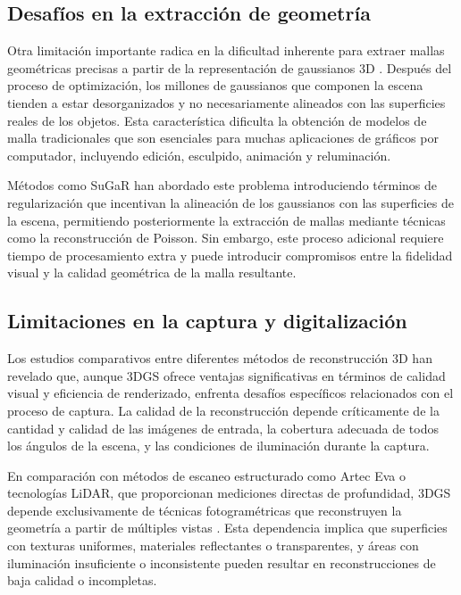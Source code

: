 \documentclass[lettersize,journal]{IEEEtran}
\begin{document}
\subsection{Desafíos en la extracción de geometría}

Otra limitación importante radica en la dificultad inherente para extraer mallas geométricas precisas a partir de la representación de gaussianos 3D \cite{Gudon2024}. Después del proceso de optimización, los millones de gaussianos que componen la escena tienden a estar desorganizados y no necesariamente alineados con las superficies reales de los objetos. Esta característica dificulta la obtención de modelos de malla tradicionales que son esenciales para muchas aplicaciones de gráficos por computador, incluyendo edición, esculpido, animación y reluminación.

Métodos como SuGaR \cite{Gudon2024} han abordado este problema introduciendo términos de regularización que incentivan la alineación de los gaussianos con las superficies de la escena, permitiendo posteriormente la extracción de mallas mediante técnicas como la reconstrucción de Poisson. Sin embargo, este proceso adicional requiere tiempo de procesamiento extra y puede introducir compromisos entre la fidelidad visual y la calidad geométrica de la malla resultante.

\subsection{Limitaciones en la captura y digitalización}

Los estudios comparativos entre diferentes métodos de reconstrucción 3D \cite{Cascarano2025, Doma2025} han revelado que, aunque 3DGS ofrece ventajas significativas en términos de calidad visual y eficiencia de renderizado, enfrenta desafíos específicos relacionados con el proceso de captura. La calidad de la reconstrucción depende críticamente de la cantidad y calidad de las imágenes de entrada, la cobertura adecuada de todos los ángulos de la escena, y las condiciones de iluminación durante la captura.

En comparación con métodos de escaneo estructurado como Artec Eva o tecnologías LiDAR, que proporcionan mediciones directas de profundidad, 3DGS depende exclusivamente de técnicas fotogramétricas que reconstruyen la geometría a partir de múltiples vistas \cite{Luhmann2019}. Esta dependencia implica que superficies con texturas uniformes, materiales reflectantes o transparentes, y áreas con iluminación insuficiente o inconsistente pueden resultar en reconstrucciones de baja calidad o incompletas.
\end{document}
